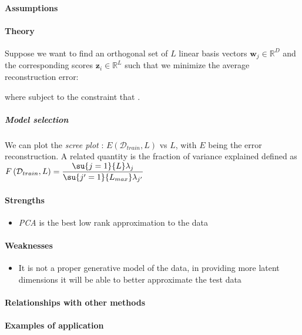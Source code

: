 \paragraph{Assumptions}
\paragraph{Theory}
Suppose we want to find an orthogonal set of $L$ linear basis vectors $\bm{w}_{j}\in
\mathbb{R}^{D}$ and the corresponding scores $\bm{z}_{i}\in\mathbb{R}^{L}$ such that we
minimize the average reconstruction error:
\begin{center}
\end{center}
where  subject to the constraint that . 
\subparagraph{Model selection}
We can plot the \emph{scree plot} : $E(\mathcal{D}_{train}, L)$ vs $L$, with $E$ being
the error reconstruction. 
A related quantity is the fraction of variance explained defined as $F\left(
\mathcal{D}_{train}, L\right) = \dfrac{\su{j=1}{L}\lambda_{j}}{\su{j'=1}{L_{max}}
\lambda_{j'}}$

\paragraph{Strengths}
\begin{itemize}
    \item \emph{PCA} is the best low rank approximation to the data
\end{itemize}

\paragraph{Weaknesses}
\begin{itemize}
    \item It is not a proper generative model of the data, in providing more latent 
        dimensions it will be able to better approximate the test data
\end{itemize}
\paragraph{Relationships with other methods}
\paragraph{Examples of application}

